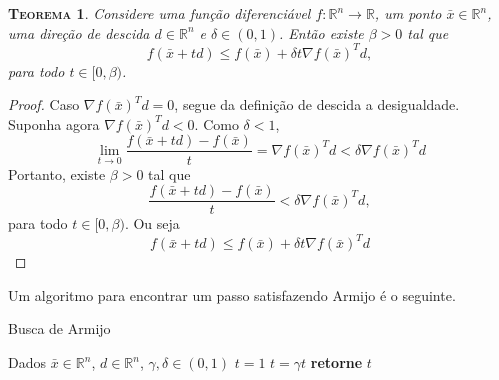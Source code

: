 \documentclass[
	12pt,				%
    oneside,			%
	a4paper,			%
	english,			%
	french,				%
	spanish,			%
	brazil,				%
	]{abntex2}
\newtheorem{theorem}{\scshape Teorema}[section]
\begin{document}
            \begin{theorem}
                Considere uma função diferenciável $f:\mathbb{R}^n \to \mathbb{R}$, um ponto $\bar{x} \in \mathbb{R}^n$, uma direção de descida $d\in\mathbb{R}^n$ e $\delta \in (0,1)$. Então existe $\beta > 0$ tal que
                \begin{equation*}
                    f(\bar{x} + td) \leq f(\bar{x}) + \delta t \nabla f(\bar{x})^Td,
                \end{equation*}
                para todo $t \in [0,\beta)$.
            \end{theorem}
            \begin{proof}
                Caso $\nabla f(\bar{x})^Td = 0$, segue da definição de descida a desigualdade. Suponha agora $\nabla f(\bar{x})^Td <  0$. Como $\delta < 1$,
                \begin{equation*}
                    \lim_{t \to 0} \frac{f(\bar{x} + td) - f(\bar{x})}{t} = \nabla f(\bar{x})^Td  < \delta \nabla f(\bar{x})^Td
                \end{equation*}
                Portanto, existe $\beta > 0$ tal que
                \begin{equation*}
                    \frac{f(\bar{x} + td) - f(\bar{x})}{t} < \delta \nabla f(\bar{x})^Td,
                \end{equation*}
                para todo $t \in [0, \beta)$. Ou seja
                \begin{equation*}
                    f(\bar{x} + td) \leq f(\bar{x}) + \delta t \nabla f(\bar{x})^Td
                \end{equation*}
            \end{proof}
            Um algoritmo para encontrar um passo satisfazendo Armijo é o seguinte.
            \begin{algorithm}
                \caption{Busca de Armijo}
                \label{alg:arm}
                \begin{algorithmic}[1]
                    \State Dados $\bar{x} \in \mathbb{R}^n$, $d\in \mathbb{R}^n$, $\gamma, \delta \in (0,1)$
                    \State $t = 1$
                        \State $t = \gamma t$
                    \EndWhile
                    \State \textbf{retorne} $t$
                \end{algorithmic}
            \end{algorithm}
\end{document}
